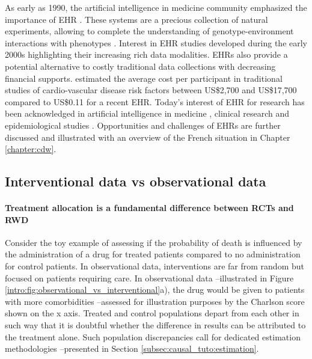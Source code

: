 \documentclass[french,12pt,twoside,a4paper]{book}
\begin{document}
\begin{background_box_left}
  As early as 1990, the artificial intelligence in medicine community emphasized
  the importance of EHR \citep{shortliffe1993adolescence}. These systems are a
  precious collection of natural experiments, allowing to complete the
  understanding of genotype-environment interactions with phenotypes
  \citep{butte2006creation,patel2009coming}. Interest in EHR studies developed
  during the early 2000s highlighting their increasing rich data modalities.
  EHRs also provide a potential alternative to costly traditional data
  collections with decreasing financial supports. \cite{casey2016using}
  estimated \textcolor{h_color}{the average cost per participant in traditional
    studies of cardio-vascular disease risk factors between US\$2,700 and
    US\$17,700 compared to US\$0.11 for a recent EHR.} Today's interest of EHR for
  research has been acknowledged in artificial intelligence in medicine
  \citep{yu2018artificial}, clinical research \citep{cowie2017electronic} and
  epidemiological studies \citep{casey2016using,gianfrancesco2021narrative}.
  Opportunities and challenges of EHRs are further discussed and illustrated
  with an overview of the French situation in Chapter \ref{chapter:cdw}.


  \subsection{Interventional data vs observational data}%
  \label{subsec:intro:interventional_vs_observational}%

  \paragraph{Treatment allocation is a fundamental difference between RCTs and RWD}
  Consider the toy example of assessing if the probability of death is
  influenced by \textcolor{I}{the administration of a drug for treated patients}
  compared to \textcolor{C}{no administration for control patients}. In
  observational data, interventions are far from random but focused on patients
  requiring care. In observational data --illustrated in Figure
  \ref{intro:fig:observational_vs_interventional}a), the drug would be given to
  patients with more comorbidities --assessed for illustration purposes by the
  Charlson score \citep{charlson_new_1987} shown on the x axis. Treated and
  control populations depart from each other in such way that it is doubtful
  whether the difference in results can be attributed to the treatment alone.
  Such population discrepancies call for dedicated estimation methodologies
  --presented in Section \ref{subsec:causal_tuto:estimation}.

\end{background_box_left}
\end{document}
